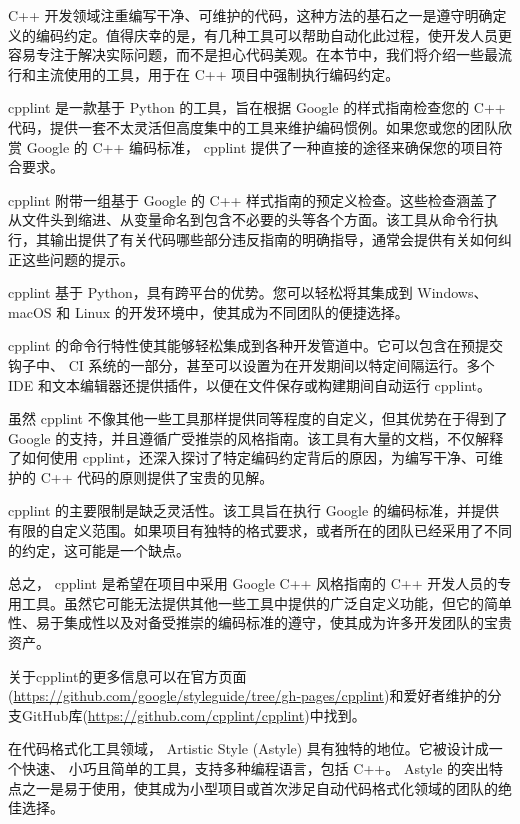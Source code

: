 
C++ 开发领域注重编写干净、可维护的代码，这种方法的基石之一是遵守明确定义的编码约定。值得庆幸的是，有几种工具可以帮助自动化此过程，使开发人员更容易专注于解决实际问题，而不是担心代码美观。在本节中，我们将介绍一些最流行和主流使用的工具，用于在 C++ 项目中强制执行编码约定。


cpplint 是一款基于 Python 的工具，旨在根据 Google 的样式指南检查您的 C++ 代码，提供一套不太灵活但高度集中的工具来维护编码惯例。如果您或您的团队欣赏 Google 的 C++ 编码标准， cpplint 提供了一种直接的途径来确保您的项目符合要求。

cpplint 附带一组基于 Google 的 C++ 样式指南的预定义检查。这些检查涵盖了从文件头到缩进、从变量命名到包含不必要的头等各个方面。该工具从命令行执行，其输出提供了有关代码哪些部分违反指南的明确指导，通常会提供有关如何纠正这些问题的提示。

cpplint 基于 Python，具有跨平台的优势。您可以轻松将其集成到 Windows、 macOS 和 Linux 的开发环境中，使其成为不同团队的便捷选择。

cpplint 的命令行特性使其能够轻松集成到各种开发管道中。它可以包含在预提交钩子中、 CI 系统的一部分，甚至可以设置为在开发期间以特定间隔运行。多个 IDE 和文本编辑器还提供插件，以便在文件保存或构建期间自动运行 cpplint。

虽然 cpplint 不像其他一些工具那样提供同等程度的自定义，但其优势在于得到了 Google 的支持，并且遵循广受推崇的风格指南。该工具有大量的文档，不仅解释了如何使用 cpplint，还深入探讨了特定编码约定背后的原因，为编写干净、可维护的 C++ 代码的原则提供了宝贵的见解。

cpplint 的主要限制是缺乏灵活性。该工具旨在执行 Google 的编码标准，并提供有限的自定义范围。如果项目有独特的格式要求，或者所在的团队已经采用了不同的约定，这可能是一个缺点。

总之， cpplint 是希望在项目中采用 Google C++ 风格指南的 C++ 开发人员的专用工具。虽然它可能无法提供其他一些工具中提供的广泛自定义功能，但它的简单性、易于集成性以及对备受推崇的编码标准的遵守，使其成为许多开发团队的宝贵资产。

关于cpplint的更多信息可以在官方页面(\url{https://github.com/google/styleguide/tree/gh-pages/cpplint})和爱好者维护的分支GitHub库(\url{https://github.com/cpplint/cpplint})中找到。


在代码格式化工具领域， Artistic Style (Astyle) 具有独特的地位。它被设计成一个快速、 小巧且简单的工具，支持多种编程语言，包括 C++。 Astyle 的突出特点之一是易于使用，使其成为小型项目或首次涉足自动代码格式化领域的团队的绝佳选择。

